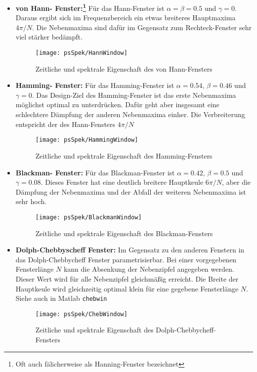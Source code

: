 \begin{itemize}
    \item {\bf von Hann- Fenster:\footnote{Oft auch fälicherweise als Hanning-Fenster
    bezeichnet}} Für das Hann-Fenster ist $\alpha = \beta = 0.5$
    und $\gamma = 0$. Daraus ergibt sich im Frequenzbereich ein
    etwas breiteres Hauptmaxima $4\pi/N$. Die Nebenmaxima sind dafür im
    Gegensatz zum Rechteck-Fenster sehr viel stärker bedämpft.
\begin{figure}[H]
\begin{center}
\texttt{[image: psSpek/HannWindow]}
\caption{\label{pic:HannWindow}Zeitliche und spektrale Eigenschaft
des von Hann-Fensters}
\end{center}
\end{figure}

    \item {\bf Hamming- Fenster:} Für das Hamming-Fenster ist $\alpha = 0.54$, $\beta = 0.46$
    und $\gamma = 0$. Das Design-Ziel des Hamming-Fenster ist das
    erste Nebenmaxima möglichst optimal zu unterdrücken. Dafür
    geht aber insgesamt eine schlechtere Dämpfung der
    anderen Nebenmaxima einher. Die Verbreiterung entspricht der
    des Hann-Fensters $4\pi/N$
\begin{figure}[H]
\begin{center}
\texttt{[image: psSpek/HammingWindow]}
\caption{\label{pic:HammingWindow}Zeitliche und spektrale Eigenschaft
des Hamming-Fensters}
\end{center}
\end{figure}
    \item {\bf Blackman- Fenster:} Für das Blackman-Fenster ist $\alpha = 0.42$, $ \beta = 0.5$
    und $\gamma = 0.08$. Dieses Fenster hat eine deutlich breitere
    Hauptkeule $6\pi/N$, aber die Dämpfung der Nebenmaxima und der Abfall
    der weiteren Nebenmaxima ist sehr hoch.
\begin{figure}[H]
\begin{center}
\texttt{[image: psSpek/BlackmanWindow]}
\caption{\label{pic:BlackmanWindow}Zeitliche und spektrale Eigenschaft
des Blackman-Fensters}
\end{center}
\end{figure}
    \item {\bf Dolph-Chebbyscheff Fenster:} Im Gegensatz zu den anderen Fenstern in das
    Dolph-Chebbycheff Fenster parametrisierbar. Bei einer vorgegebenen Fensterlänge $N$ kann die
    Absenkung der Nebenzipfel angegeben werden. Dieser Wert wird für alle Nebenzipfel
    gleichmäßig erreicht. Die Breite der Hauptkeule wird gleichzeitig optimal klein für eine
    gegebene Fensterlänge $N$.
    Siehe auch in Matlab \verb/chebwin/
\begin{figure}[H]
\begin{center}
\texttt{[image: psSpek/ChebWindow]}
\caption{\label{pic:ChebWindow}Zeitliche und spektrale Eigenschaft
des Dolph-Chebbycheff-Fensters}
\end{center}
\end{figure}


\end{itemize}
